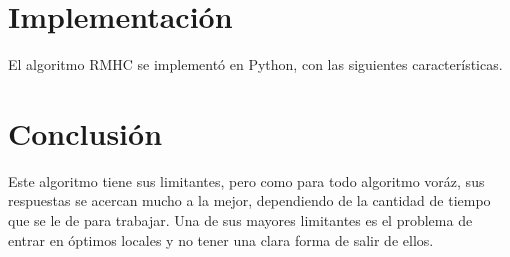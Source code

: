 \documentclass[10pt]{report}
\begin{document}
\section*{Implementación}

El algoritmo RMHC se implementó en Python, con las siguientes características.

\section*{Conclusión}

Este algoritmo tiene sus limitantes, pero como para todo algoritmo voráz, sus respuestas se acercan mucho a la mejor, dependiendo de la cantidad de tiempo que se le de para trabajar. Una de sus mayores limitantes es el problema de entrar en óptimos locales y no tener una clara forma de salir de ellos.
\end{document}
